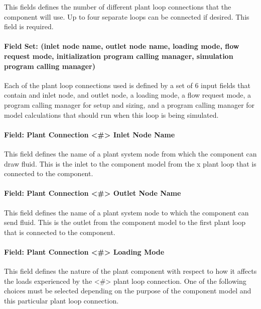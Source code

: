 This fields defines the number of different plant loop connections that the component will use. Up to four separate loops can be connected if desired. This field is required.

\paragraph{Field Set: (inlet node name, outlet node name, loading mode, flow request mode, initialization program calling manager, simulation program calling manager)}\label{fieldset-inlet-node-name-outlet-node-name-loading-mode-flow-request-mode-initialization-program-calling-manager-simulation-program-calling-manager.}

Each of the plant loop connections used is defined by a set of 6 input fields that contain and inlet node, and outlet node, a loading mode, a flow request mode, a program calling manager for setup and sizing, and a program calling manager for model calculations that should run when this loop is being simulated.

\paragraph{Field: Plant Connection \textless{}\#\textgreater{} Inlet Node Name}\label{field-plant-connection-x-inlet-node-name}

This field defines the name of a plant system node from which the component can draw fluid. This is the inlet to the component model from the x plant loop that is connected to the component.

\paragraph{Field: Plant Connection \textless{}\#\textgreater{} Outlet Node Name}\label{field-plant-connection-x-outlet-node-name}

This field defines the name of a plant system node to which the component can send fluid. This is the outlet from the component model to the first plant loop that is connected to the component.

\paragraph{Field: Plant Connection \textless{}\#\textgreater{} Loading Mode}\label{field-plant-connection-x-loading-mode}

This field defines the nature of the plant component with respect to how it affects the loads experienced by the \textless{}\#\textgreater{} plant loop connection. One of the following choices must be selected depending on the purpose of the component model and this particular plant loop connection.

